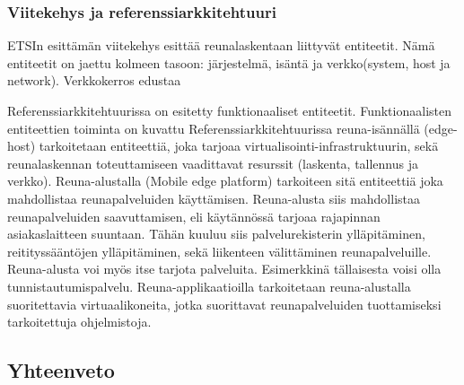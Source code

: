 \documentclass[finnish]{tktltiki2}
\theoremstyle{definition}
\theoremstyle{remark}
\begin{document}
\subsubsection{Viitekehys ja referenssiarkkitehtuuri}

ETSIn esittämän viitekehys esittää reunalaskentaan liittyvät entiteetit. Nämä entiteetit on jaettu kolmeen tasoon: järjestelmä, isäntä ja verkko(system, host ja network). 
Verkkokerros edustaa 

Referenssiarkkitehtuurissa on esitetty funktionaaliset entiteetit. Funktionaalisten entiteettien toiminta on kuvattu 
Referenssiarkkitehtuurissa reuna-isännällä (edge-host) tarkoitetaan entiteettiä, joka tarjoaa virtualisointi-infrastruktuurin, sekä reunalaskennan toteuttamiseen vaadittavat resurssit (laskenta, tallennus ja verkko).
Reuna-alustalla (Mobile edge platform) tarkoiteen sitä entiteettiä joka mahdollistaa reunapalveluiden käyttämisen. Reuna-alusta siis mahdollistaa reunapalveluiden saavuttamisen, eli käytännössä tarjoaa rajapinnan asiakaslaitteen suuntaan. Tähän kuuluu siis palvelurekisterin ylläpitäminen, reitityssääntöjen ylläpitäminen, sekä liikenteen välittäminen reunapalveluille. Reuna-alusta voi myös itse tarjota  palveluita.
Esimerkkinä tällaisesta voisi olla tunnistautumispalvelu. 
Reuna-applikaatioilla tarkoitetaan reuna-alustalla suoritettavia virtuaalikoneita, jotka suorittavat reunapalveluiden tuottamiseksi tarkoitettuja ohjelmistoja.
\subsection{Yhteenveto}

 




\lastpage



% 
\end{document}
